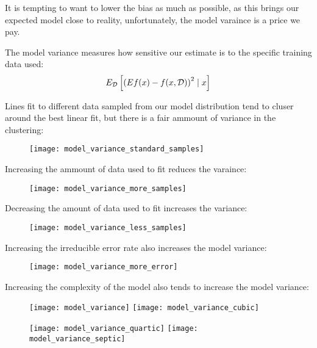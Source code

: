 %
%
\begin{frame}
  It is tempting to want to lower the bias as much as possible, as this brings
  our expected model close to reality, unfortunately, the model varaince is a
  price we pay.
\end{frame}
%
%
\begin{frame}
  The model variance measures how sensitive our estimate is to the specific
  training data used:
      $$ E_{\operatorname*{\mathcal{D}}} \left[ \left( Ef(x) - f(x,\operatorname*{\mathcal{D}}) \right)^2 \mid x \right] $$
\end{frame}
%
%
\begin{frame}
   Lines fit to different data sampled from our model distribution tend to
   cluser around the best linear fit, but there is a fair ammount of variance in
   the clustering:
  \begin{figure}
    \texttt{[image: model\_variance\_standard\_samples]}
  \end{figure}
\end{frame}
%
%
\begin{frame}
  Increasing the ammount of data used to fit reduces the varaince:
  \begin{figure}
    \texttt{[image: model\_variance\_more\_samples]}
  \end{figure}
\end{frame}
%
%
\begin{frame}
  Decreasing the amount of data used to fit increases the variance:
  \begin{figure}
    \texttt{[image: model\_variance\_less\_samples]}
  \end{figure}
\end{frame}
%
%
\begin{frame}
  Increasing the irreducible error rate also increases the model variance:
  \begin{figure}
    \texttt{[image: model\_variance\_more\_error]}
  \end{figure}
\end{frame}
%
%
\begin{frame}
  Increasing the complexity of the model also tends to increase the model
  variance:
  \begin{figure}
      \texttt{[image: model\_variance]}
      \texttt{[image: model\_variance\_cubic]}
  \end{figure}
  \begin{figure}
      \texttt{[image: model\_variance\_quartic]}
      \texttt{[image: model\_variance\_septic]}
  \end{figure}
\end{frame}
